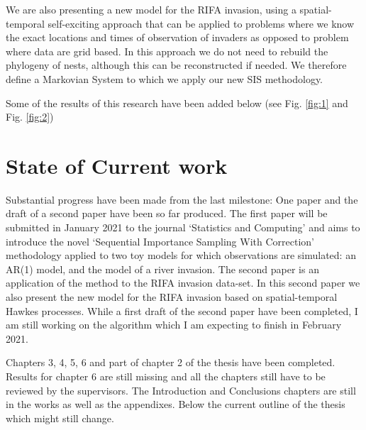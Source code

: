 \documentclass[11pt,a4paper]{article}
\begin{document}
We are also presenting a new model for the RIFA invasion, using a spatial-temporal self-exciting approach that can be applied to problems where we know the exact locations and times of observation of invaders as opposed to problem where data are grid based. In this approach we do not need to rebuild the phylogeny of nests, although this can be reconstructed if needed. We therefore define a Markovian System to which we apply our new SIS methodology.

Some of the results of this research have been added below (see Fig. \ref{fig:1} and Fig. \ref{fig:2})
\section{State of Current work}

Substantial progress have been made from the last milestone: One paper and the draft of a second paper have been so far produced. The first paper will be submitted in January 2021 to the journal `Statistics and Computing' and aims to introduce the novel `Sequential Importance Sampling With Correction' methodology applied to two toy models for which observations are simulated: an AR(1) model, and the model of a river invasion. The second paper is an application of the method to the RIFA invasion data-set. In this second paper we also present the new model for the RIFA invasion based on spatial-temporal Hawkes processes. While a first draft of the second paper have been completed, I am still working on the algorithm which I am expecting to finish in February 2021.

Chapters 3, 4, 5, 6 and part of chapter 2 of the thesis have been completed. Results for chapter 6 are still missing and all the chapters still have to be reviewed by the supervisors. The Introduction and Conclusions chapters are still in the works as well as the appendixes. Below the current outline of the thesis which might still change.
\end{document}

